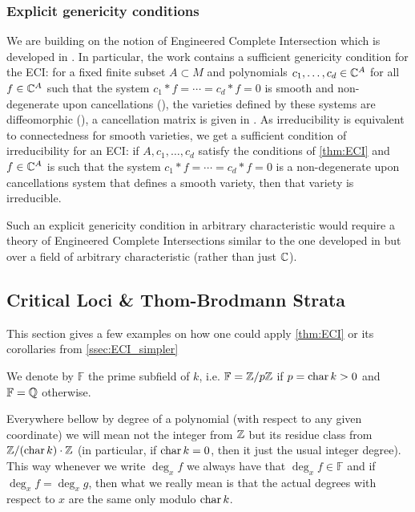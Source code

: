 \subsubsection{Explicit genericity conditions}
We are building on the notion of Engineered Complete Intersection which is developed in \cite{Esterov2024}. In particular, the work contains a sufficient genericity condition for the ECI: for a fixed finite subset $A \subset M$ and polynomials $c_1, \dots, c_d \in \mathbb C^A$ for all $f \in \mathbb C^A$ such that the system $c_1 * f = \cdots = c_d * f = 0$ is smooth and non-degenerate upon cancellations (\cite[Def. 1.6.2]{Esterov2024}), the varieties defined by these systems are diffeomorphic (\cite[Prop. 4.14.2]{Esterov2024}), a cancellation matrix is given in \cite[Cor. 4.6]{Esterov2024}. As irreducibility is equivalent to connectedness for smooth varieties, we get a sufficient condition of irreducibility for an ECI: if $A, c_1, \dots, c_d$ satisfy the conditions of \autoref{thm:ECI} and $f \in \mathbb C^A$ is such that the system $c_1 * f = \cdots = c_d * f = 0$ is a non-degenerate upon cancellations system that defines a smooth variety, then that variety is irreducible.

Such an explicit genericity condition in arbitrary characteristic would require a theory of Engineered Complete Intersections similar to the one developed in \cite{Esterov2024} but over a field of arbitrary characteristic (rather than just $\mathbb C$).

\subsection{Critical Loci \& Thom-Brodmann Strata}\label{ssec:ECI_critical}
This section gives a few examples on how one could apply \autoref{thm:ECI} or its corollaries from \autoref{ssec:ECI_simpler}

\begin{notation}
    We denote by $\mathbb F$ the prime subfield of $k$, i.e. $\mathbb F = \mathbb Z/p\mathbb Z$ if $p = \operatorname{char} k > 0$ and $\mathbb F = \mathbb Q$ otherwise.
\end{notation}

\begin{notation}
    Everywhere bellow by degree of a polynomial (with respect to any given coordinate) we will mean not the integer from $\mathbb Z$ but its residue class from $\mathbb Z/(\operatorname{char} k) \cdot \mathbb Z$ (in particular, if $\operatorname{char} k = 0$, then it just the usual integer degree). This way whenever we write $\deg_x f$ we always have that $\deg_x f \in \mathbb F$ and if $\deg_x f = \deg_x g$, then what we really mean is that the actual degrees with respect to $x$ are the same only modulo $\operatorname{char} k$.
\end{notation}


